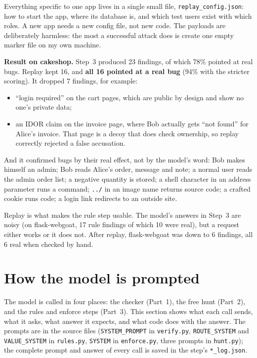 \documentclass[11pt,a4paper]{article}
\newcommand{\code}[1]{\texttt{#1}}
\begin{document}
Everything specific to one app lives in a single small file, \code{replay\_config.json}: how to start the app,
where its database is, and which test users exist with which roles. A new app needs a new config file, not new
code. The payloads are deliberately harmless: the most a successful attack does is create one empty marker file
on my own machine.

\textbf{Result on cakeshop.} Step~3 produced 23 findings, of which 78\% pointed at real bugs. Replay kept 16,
and \textbf{all 16 pointed at a real bug} (94\% with the stricter scoring). It dropped 7 findings, for example:

\begin{itemize}
  \item ``login required'' on the cart pages, which are public by design and show no one's private data;
  \item an IDOR claim on the invoice page, where Bob actually gets ``not found'' for Alice's invoice. That
        page is a decoy that does check ownership, so replay correctly rejected a false accusation.
\end{itemize}

And it confirmed bugs by their real effect, not by the model's word: Bob makes himself an admin; Bob reads
Alice's order, message and note; a normal user reads the admin order list; a negative quantity is stored; a shell
character in an address parameter runs a command; \code{../} in an image name returns source code; a crafted
cookie runs code; a login link redirects to an outside site.

\begin{lesson}
Replay is what makes the rule step usable. The model's answers in Step~3 are noisy (on flask-webgoat, 17 rule
findings of which 10 were real), but a request either works or it does not. After replay, flask-webgoat was down
to 6 findings, all 6 real when checked by hand.
\end{lesson}

\section{How the model is prompted}
\label{sec:prompts}

The model is called in four places: the checker (Part~1), the free hunt (Part~2), and the rules and enforce steps
(Part~3). This section shows what each call sends, what it asks, what answer it expects, and what code does with
the answer. The prompts are in the source files (\code{SYSTEM\_PROMPT} in \code{verify.py}, \code{ROUTE\_SYSTEM} and
\code{VALUE\_SYSTEM} in \code{rules.py}, \code{SYSTEM} in \code{enforce.py}, three prompts in \code{hunt.py}); the
complete prompt and answer of every call is saved in the step's \code{*\_log.json}.
\end{document}
